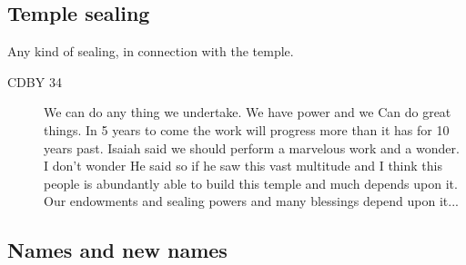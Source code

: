 \begin{description}
		\end{description}
		
	\subsection{Temple sealing} %
	
		Any kind of sealing, in connection with the temple.
		
		\begin{description}
		\item[CDBY 34] We can do any thing we undertake. We have power and we Can do great things. In 5 years to come the work will progress more than it has for 10 years past. Isaiah said we should perform a marvelous work and a wonder. I don't wonder He said so if he saw this vast multitude and I think this people is abundantly able to build this temple and much depends upon it. Our endowments and sealing powers and many blessings depend upon it...
		\end{description}

	\subsection{Names and new names} %

